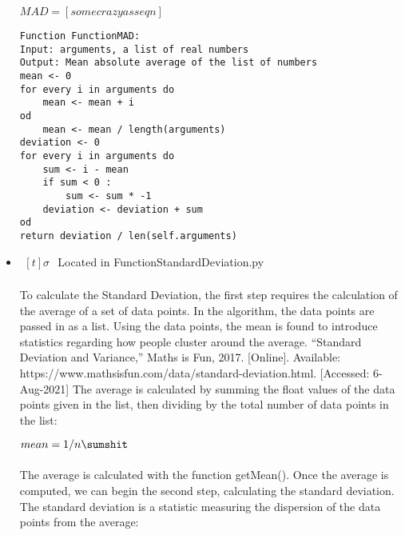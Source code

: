 \begin{itemize}
            \begin{center}
                $MAD = [some crazyass eqn]$
            \end{center}

            \begin{lstlisting}
Function FunctionMAD:
Input: arguments, a list of real numbers
Output: Mean absolute average of the list of numbers
mean <- 0
for every i in arguments do
	mean <- mean + i
od
    mean <- mean / length(arguments)
deviation <- 0
for every i in arguments do
	sum <- i - mean
    if sum < 0 :
        sum <- sum * -1
    deviation <- deviation + sum
od
return deviation / len(self.arguments)
            \end{lstlisting}

        \item $\begin{aligned}[t]
            \sigma
        \end{aligned}$
            Located in FunctionStandardDeviation.py

            \paragraph{}
            To calculate the Standard Deviation, the first step requires the calculation of the average of a set of data points. In the algorithm, the data points are passed in as a list. Using the data points, the mean is found to introduce statistics regarding how people cluster around the average. “Standard Deviation and Variance,” Maths is Fun, 2017. [Online]. Available: https://www.mathsisfun.com/data/standard-deviation.html. [Accessed: 6-Aug-2021] The average is calculated by summing the float values of the data points given in the list, then dividing by the total number of data points in the list:

            \begin{center}
                $mean = 1/n \sumshit$
            \end{center}

            \paragraph{}
            The average is calculated with the function getMean(). Once the average is computed, we can begin the second step, calculating the standard deviation. The standard deviation is a statistic measuring the dispersion of the data points from the average:


\end{itemize}
